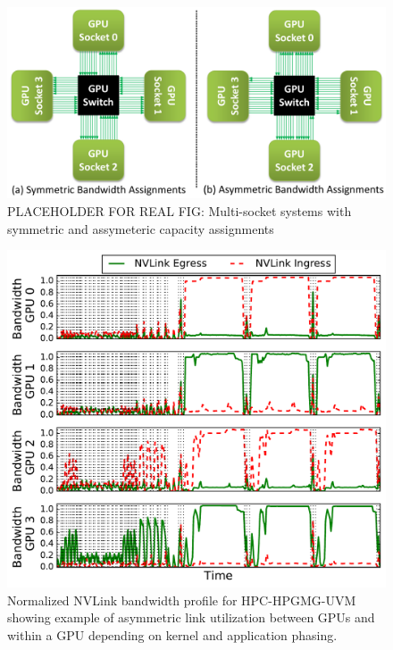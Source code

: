 \begin{figure}[t]
    \centering
    \includegraphics[width=1.0\columnwidth]{figures/tms_links.pdf}
    \caption{PLACEHOLDER FOR REAL FIG: Multi-socket systems with symmetric and
    assymeteric capacity assignments}
    \label{fig:symmetric_assymetric}
\end{figure}

\begin{figure}[t]
    \centering
    \includegraphics[width=1.0\columnwidth]{figures/bw_profile_HPGMG_UVM_base.pdf}
    \caption{Normalized NVLink bandwidth profile for HPC-HPGMG-UVM showing example of asymmetric 
    link utilization between GPUs and within a GPU depending on kernel and application phasing.}
    \label{fig:link-motivation}
\end{figure}

